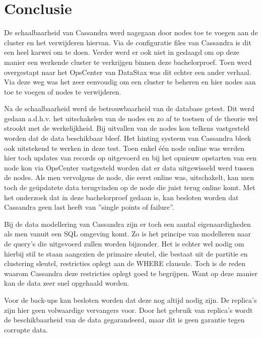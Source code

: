 \chapter{Conclusie}
\label{ch:conclusie}


De schaalbaarheid van Cassandra werd nagegaan door nodes toe te voegen aan de cluster en het verwijderen hiervan.
Via de configuratie files van Cassandra is dit een heel karwei om te doen.
Verder werd er ook niet in geslaagd om op deze manier een werkende cluster te verkrijgen binnen deze bachelorproef.
Toen werd overgestapt naar het OpsCenter van DataStax was dit echter een ander verhaal.
Via deze weg was het zeer eenvoudig om een cluster te beheren en hier nodes aan toe te voegen of nodes te verwijderen.

Na de schaalbaarheid werd de betrouwbaarheid van de database getest.
Dit werd gedaan a.d.h.v. het uitschakelen van de nodes en zo af te toetsen of de theorie wel strookt met de werkelijkheid.
Bij uitvallen van de nodes kon telkens vastgesteld worden dat de data beschikbaar bleef.
Het hinting systeem van Cassandra bleek ook uitstekend te werken in deze test.
Toen enkel één node online was werden hier toch updates van records op uitgevoerd en bij het opnieuw opstarten van een node kon via OpsCenter vastgesteld worden dat er data uitgewisseld werd tussen de nodes.
Als men vervolgens de node, die eerst online was, uitschakelt, kan men toch de geüpdatete data terugvinden op de node die juist terug online komt.
Met het onderzoek dat in deze bachelorproef gedaan is, kan besloten worden dat Cassandra geen last heeft van ''single points of failure''.

Bij de data modellering van Cassandra zijn er toch een aantal eigenaardigheden als men vanuit een SQL omgeving komt.
Zo is het principe van modelleren naar de query's die uitgevoerd zullen worden bijzonder.
Het is echter wel nodig om hierbij stil te staan aangezien de primaire sleutel, die bestaat uit de partitie en clustering sleutel, restricties oplegt aan de WHERE clausule.
Toch is de reden waarom Cassandra deze restricties oplegt goed te begrijpen.
Want op deze manier kan de data zeer snel opgehaald worden.

Voor de back-ups kan besloten worden dat deze nog altijd nodig zijn.
De replica's zijn hier geen volwaardige vervangers voor.
Door het gebruik van replica's wordt de beschikbaarheid van de data gegarandeerd, maar dit is geen garantie tegen corrupte data.

